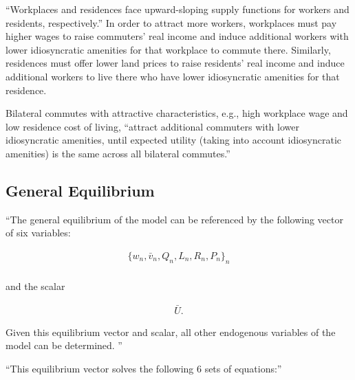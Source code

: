 \documentclass[10pt]{article}
\begin{document}
``Workplaces and residences face upward-sloping supply 
functions for workers and residents, respectively.''
In order to attract more workers, workplaces must pay 
higher wages to raise commuters' real income and
induce additional workers
with lower idiosyncratic amenities for that 
workplace to commute there.
Similarly, residences must offer lower land prices 
to raise residents' real income and induce additional
workers to live there who have lower idiosyncratic amenities
for that residence.

Bilateral commutes with attractive characteristics, 
e.g., high workplace wage and low residence cost of living, 
``attract additional commuters with lower 
idiosyncratic amenities, until expected utility 
(taking into account idiosyncratic amenities) 
is the same across all bilateral commutes.''


\subsection{General Equilibrium}

``The general equilibrium 
of the model 
can be referenced 
by the following 
vector of six variables: 

\begin{align}
    \{w_n, \bar{v}_n, Q_n, L_n, R_n, P_n\}_n \\
\end{align}

and the scalar 

\begin{align}
    \bar{U}.
\end{align}

Given this equilibrium vector 
and scalar, all other endogenous 
variables 
of the model can be determined. ''

``This equilibrium vector 
solves the following 6 sets of equations:''
\end{document}
